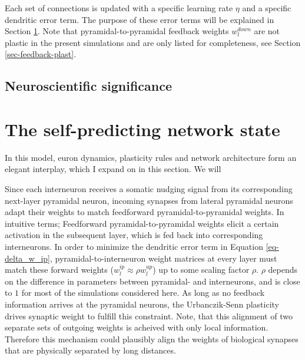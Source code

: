 Each set of connections is updated with a specific learning rate $\eta$ and a specific dendritic error term. The purpose
of these error terms will be explained in Section \ref{sec-selfpred}. 
Note that pyramidal-to-pyramidal feedback weights $w_l^{down}$ are not plastic in the present simulations and are only
listed for completeness, see Section \ref{sec-feedback-plast}.


\subsection{Neuroscientific significance}



\section{The self-predicting network state}\label{sec-selfpred}

In this model, euron dynamics, plasticity rules and network architecture form an elegant interplay, which I expand on in
this section. We will

Since each interneuron receives a somatic nudging signal from its corresponding next-layer pyramidal neuron, incoming
synapses from lateral pyramidal neurons adapt their weights to match feedforward pyramidal-to-pyramidal weights. In
intuitive terms; Feedforward pyramidal-to-pyramidal weights elicit a certain activation in the subsequent layer, which
is fed back into corresponding interneurons. In order to minimize the dendritic error term in Equation
\ref{eq-delta_w_ip}, pyramidal-to-interneuron weight matrices at every layer must match these forward weights ($w_l^{ip}
\approx \rho w_l^{up}$) up to some scaling factor $\rho$. $\rho$ depends on the difference in parameters between
pyramidal- and interneurons, and is close to $1$ for most of the simulations considered here. As long as no feedback
information arrives at the pyramidal neurons, the Urbanczik-Senn plasticity drives synaptic weight to fulfill this
constraint. Note, that this alignment of two separate sets of outgoing weights is acheived with only local information.
Therefore this mechanism could plausibly align the weights of biological synapses that are physically separated by long
distances. \newline

